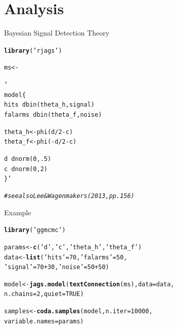 \documentclass{beamer}\usepackage[]{graphicx}\usepackage[]{color}
\makeatletter
\newcommand{\hlnum}[1]{\textcolor[rgb]{0.686,0.059,0.569}{#1}}%
\newcommand{\hlstr}[1]{\textcolor[rgb]{0.192,0.494,0.8}{#1}}%
\newcommand{\hlcom}[1]{\textcolor[rgb]{0.678,0.584,0.686}{\textit{#1}}}%
\newcommand{\hlopt}[1]{\textcolor[rgb]{0,0,0}{#1}}%
\newcommand{\hlstd}[1]{\textcolor[rgb]{0.345,0.345,0.345}{#1}}%
\newcommand{\hlkwb}[1]{\textcolor[rgb]{0.69,0.353,0.396}{#1}}%
\newcommand{\hlkwc}[1]{\textcolor[rgb]{0.333,0.667,0.333}{#1}}%
\newcommand{\hlkwd}[1]{\textcolor[rgb]{0.737,0.353,0.396}{\textbf{#1}}}%
\newenvironment{kframe}{%
 \def\at@end@of@kframe{}%
 \ifinner\ifhmode%
  \def\at@end@of@kframe{\end{minipage}}%
  \begin{minipage}{\columnwidth}%
 \fi\fi%
 \def\FrameCommand##1{\hskip\@totalleftmargin \hskip-\fboxsep
 \colorbox{shadecolor}{##1}\hskip-\fboxsep
     \hskip-\linewidth \hskip-\@totalleftmargin \hskip\columnwidth}%
 \MakeFramed {\advance\hsize-\width
   \@totalleftmargin\z@ \linewidth\hsize
   \@setminipage}}%
 {\par\unskip\endMakeFramed%
 \at@end@of@kframe}
\newenvironment{knitrout}{}{} %
\makeatother
\begin{document}
\section{Analysis}
\begin{frame}[fragile]{Bayesian Signal Detection Theory}
\begin{knitrout}
\color{fgcolor}\begin{kframe}
\begin{alltt}
\hlkwd{library}\hlstd{(}\hlstr{'rjags'}\hlstd{)}

\hlstd{ms} \hlkwb{<-} \hlstr{'
model \{
  hits ~ dbin(theta_h, signal)
  falarms ~ dbin(theta_f, noise)
    
  theta_h <- phi(d/2-c)
  theta_f <- phi(-d/2-c)
    
  d ~ dnorm(0, .5)
  c ~ dnorm(0, 2)
\}'}

\hlcom{# see also Lee & Wagenmakers (2013, pp.156)}
\end{alltt}
\end{kframe}
\end{knitrout}
\end{frame}

\begin{frame}[fragile]{Example}
\begin{knitrout}
\color{fgcolor}\begin{kframe}
\begin{alltt}
\hlkwd{library}\hlstd{(}\hlstr{'ggmcmc'}\hlstd{)}

\hlstd{params} \hlkwb{<-} \hlkwd{c}\hlstd{(}\hlstr{'d'}\hlstd{,} \hlstr{'c'}\hlstd{,} \hlstr{'theta_h'}\hlstd{,} \hlstr{'theta_f'}\hlstd{)}
\hlstd{data} \hlkwb{<-} \hlkwd{list}\hlstd{(}\hlstr{'hits'} \hlstd{=} \hlnum{70}\hlstd{,} \hlstr{'falarms'} \hlstd{=} \hlnum{50}\hlstd{,}
             \hlstr{'signal'} \hlstd{=} \hlnum{70} \hlopt{+} \hlnum{30}\hlstd{,} \hlstr{'noise'} \hlstd{=} \hlnum{50} \hlopt{+} \hlnum{50}\hlstd{)}

\hlstd{model} \hlkwb{<-} \hlkwd{jags.model}\hlstd{(}\hlkwd{textConnection}\hlstd{(ms),} \hlkwc{data} \hlstd{= data,}
                    \hlkwc{n.chains} \hlstd{=} \hlnum{2}\hlstd{,} \hlkwc{quiet} \hlstd{=} \hlnum{TRUE}\hlstd{)}

\hlstd{samples} \hlkwb{<-} \hlkwd{coda.samples}\hlstd{(model,} \hlkwc{n.iter} \hlstd{=} \hlnum{10000}\hlstd{,}
                        \hlkwc{variable.names} \hlstd{= params)}
\end{alltt}
\end{kframe}
\end{knitrout}
\end{frame}
\end{document}
